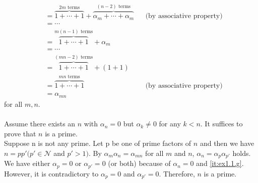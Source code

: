 \documentclass{article}
\newcommand\N{\mathcal N}
\begin{document}
\begin{align*}
  &= \overbrace{1 + \dotsb + 1}^\text{$2m$ terms} + \overbrace{\alpha_m + \dotsb + \alpha_m}^\text{$(n-2)$ terms} && \text{(by associative property)} \\
  &= \dotsb \\
  &= \overbrace{1 + \dotsb + 1}^\text{$m(n-1)$ terms} + \alpha_m \\
  &= \dotsb \\
  &= \overbrace{1 + \dotsb + 1}^\text{$(mn-2)$ terms} + (1 + 1) \\ 
  &= \overbrace{1 + \dotsb + 1}^\text{$mn$ terms} && \text{(by associative property)}\\
  &= \alpha_{mn}
\end{align*} for all $m, n$.\\\\
Assume there exists an $n$ with $\alpha_n = 0$ but $\alpha_k \ne 0$ for any $k < n$.
It suffices to prove that $n$ is a prime.\\
Suppose n is not any prime. Let p be one of prime factors of $n$ and then we have $n = p p' (p' \in\N$ and $p' > 1)$.
By $\alpha_m \alpha_n = \alpha_{mn}$ for all $m$ and $n$, $\alpha_n = \alpha_p \alpha_{p'}$ holds.
We have either $\alpha_p = 0$ or $\alpha_{p'} = 0$ (or both) because of $\alpha_n = 0$ and  \ref{it:ex1.1.g}.
However, it is contradictory to $\alpha_p = 0$ and $\alpha_{p'} = 0$. Therefore, $n$ is a prime.
\end{document}
